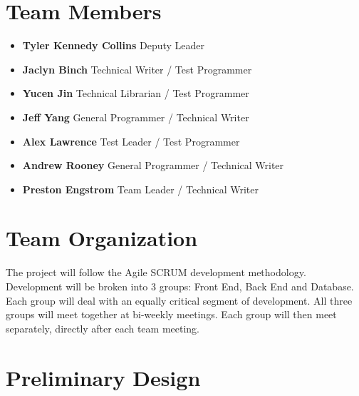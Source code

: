 \documentclass[]{article}
\begin{document}
\section{Team Members}
\begin{itemize}
	\item \textbf{Tyler Kennedy Collins} Deputy Leader
	\item \textbf{Jaclyn Binch} Technical Writer / Test Programmer
	\item \textbf{Yucen Jin} Technical Librarian / Test Programmer
	\item \textbf{Jeff Yang} General Programmer / Technical Writer
	\item \textbf{Alex Lawrence} Test Leader / Test Programmer
	\item \textbf{Andrew Rooney} General Programmer / Technical Writer
	\item \textbf{Preston Engstrom} Team Leader / Technical Writer
\end{itemize}

\section{Team Organization}
The project will follow the Agile SCRUM development methodology. Development will be broken into 3 groups: Front End, Back End and Database. Each group will deal with an equally critical segment of development. All three groups will meet together at bi-weekly meetings. Each group will then meet separately, directly after each team meeting.

\section{Preliminary Design}
\end{document}
